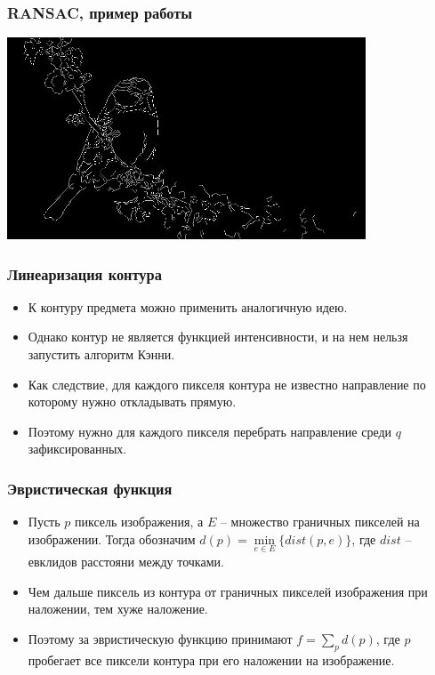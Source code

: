 \begin{frame}\frametitle{RANSAC, пример работы}
    \begin{center}
        \includegraphics[height=6cm]{veselov_imgs/l_edge_map3.jpg}
    \end{center}
\end{frame}

\begin{frame}\frametitle{Линеаризация контура}
    \begin{itemize}
        \item К контуру предмета можно применить аналогичную идею.
        \pause
        \item Однако контур не является функцией интенсивности, и на нем нельзя запустить алгоритм Кэнни.
        \pause
        \item Как следствие, для каждого пикселя контура не известно направление по которому нужно откладывать прямую.
        \pause
        \item Поэтому нужно для каждого пикселя перебрать направление среди $q$ зафиксированных.
    \end{itemize}
\end{frame}

\begin{frame}\frametitle{Эвристическая функция}
    \begin{itemize}
        \item Пусть $p$ пиксель изображения, а $E$ -- множество граничных пикселей на изображении.
        Тогда обозначим $d(p) = \min\limits_{e \in E}\{dist(p, e)\}$, где $dist$ -- евклидов расстояни
        между точками.
        \pause
        \item Чем дальше пиксель из контура от граничных пикселей изображения при наложении, тем хуже наложение.
        \pause
        \item Поэтому за эвристическую функцию принимают $f = \sum\limits_{p}{d(p)}$, где $p$ пробегает
        все пиксели контура при его наложении на изображение.
    \end{itemize}
\end{frame}

